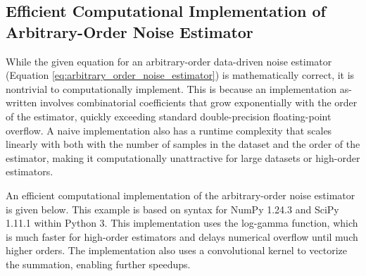\documentclass[conf]{new-aiaa}
\begin{document}
    \newpage

    \subsection{Efficient Computational Implementation of Arbitrary-Order Noise Estimator}
    \label{sec:estimator_code_example}

    While the given equation for an arbitrary-order data-driven noise estimator (Equation \ref{eq:arbitrary_order_noise_estimator}) is mathematically correct, it is nontrivial to computationally implement. This is because an implementation as-written involves combinatorial coefficients that grow exponentially with the order of the estimator, quickly exceeding standard double-precision floating-point overflow. A naive implementation also has a runtime complexity that scales linearly with both with the number of samples in the dataset and the order of the estimator, making it computationally unattractive for large datasets or high-order estimators.

    An efficient computational implementation of the arbitrary-order noise estimator is given below. This example is based on syntax for NumPy 1.24.3 and SciPy 1.11.1 within Python 3. This implementation uses the log-gamma function, which is much faster for high-order estimators and delays numerical overflow until much higher orders. The implementation also uses a convolutional kernel to vectorize the summation, enabling further speedups.
\end{document}
